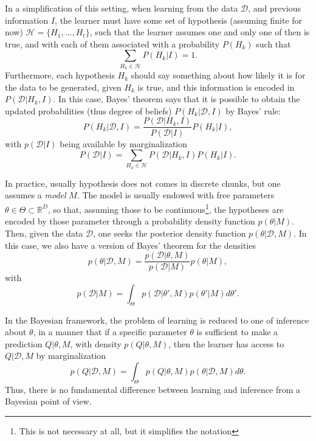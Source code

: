 In a simplification of this setting, when learning from the data $\mathcal{D}$, and previous information $I$, the learner must have some set of hypothesis (assuming finite for now) $\mathcal{H} = \{H_1,\ldots,H_t\}$, such that the learner assumes one and only one of then is true, and with each of them associated with a probability $P(H_k)$ such that
\begin{displaymath} 
\sum_{H_k \in \mathcal{H}} P(H_k|I) = 1.
\end{displaymath}
Furthermore, each hypothesis $H_k$ should say something about how likely it is for the data to be generated, given $H_k$ is true, and this information is encoded in $P(\mathcal{D}|H_k,I)$. In this case, Bayes' theorem says that it is possible to obtain the updated probabilities (thus degree of beliefs) $P(H_k|\mathcal{D},I)$ by Bayes' rule:
\begin{equation}\label{bayes_theorem_1}
 P(H_k|\mathcal{D},I) = \frac{P(\mathcal{D}|H_k,I)}{P(\mathcal{D}|I)}P(H_k|I),
\end{equation}
with $p(\mathcal{D}|I)$ being available by marginalization 
\begin{equation}\label{marginalization_1}
 P(\mathcal{D}|I) = \sum_{H_k \in \mathcal{H}} P(\mathcal{D}|H_k,I) P(H_k|I).
\end{equation}

In practice, usually hypothesis does not comes in discrete chunks, but one assumes a \textit{model} $M$. The model is usually endowed with free parameters $\theta \in \Theta \subset \mathbb{R}^D$, so that, assuming those to be continuous\footnote{This is not necessary at all, but it simplifies the notation}, the hypotheses are encoded by those parameter through a probability density function $p(\theta|M)$. Then, given the data $\mathcal{D}$, one seeks the posterior density function $p(\theta|\mathcal{D},M)$. In this case, we also have a version of Bayes' theorem for the densities
\begin{equation}\label{bayes_theorem_2}
 p(\theta | \mathcal{D},M) = \frac{p(\mathcal{D} | \theta,M)}{p(\mathcal{D}|M)} p(\theta | M),
\end{equation}
with 
\begin{equation}\label{marginalization_2}
p(\mathcal{D}|M) = \int_\Theta p(\mathcal{D}|\theta',M) p(\theta'|M) d \theta'.
\end{equation}

In the Bayesian framework, the problem of learning is reduced to one of inference about $\theta$, in a manner that if a specific parameter $\theta$ is sufficient to make a prediction $Q|\theta,M$, with density $p(Q|\theta,M)$, then the learner has access to $Q|\mathcal{D},M$ by marginalization
\begin{equation}\label{marginalizationpred}
p(Q|\mathcal{D},M) = \int_{\Theta} p(Q|\theta,M) p(\theta|\mathcal{D},M) d\theta.
\end{equation}
Thus, there is no fundamental difference between learning and inference from a Bayesian point of view.

